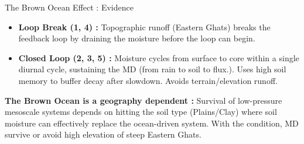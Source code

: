 \documentclass[8pt, aspectratio=169]{beamer}
\begin{document}
\begin{frame}{The Brown Ocean Effect : Evidence}
    \footnotesize
    \begin{itemize}
        \item \textbf{Loop Break (1, 4) :} Topographic runoff (Eastern Ghats) breaks the feedback loop by draining the moisture before the loop can begin. \cite{clapp1978empirical}
        \item \textbf{Closed Loop (2, 3, 5) :} Moisture cycles from surface to core within a single diurnal cycle, sustaining the MD (from rain to soil to flux.). Uses high soil memory to buffer decay after slowdown. Avoids terrain/elevation runoff.
    \end{itemize}

    \vspace{0.3}
    \footnotesize
    \textbf{The Brown Ocean is a geography dependent :} Survival of low-pressure mesoscale systems depends on hitting the soil type (Plains/Clay) where soil moisture can effectively replace the ocean-driven system. With the condition, MD survive or avoid high elevation of steep Eastern Ghats.
\end{frame}
\end{document}
